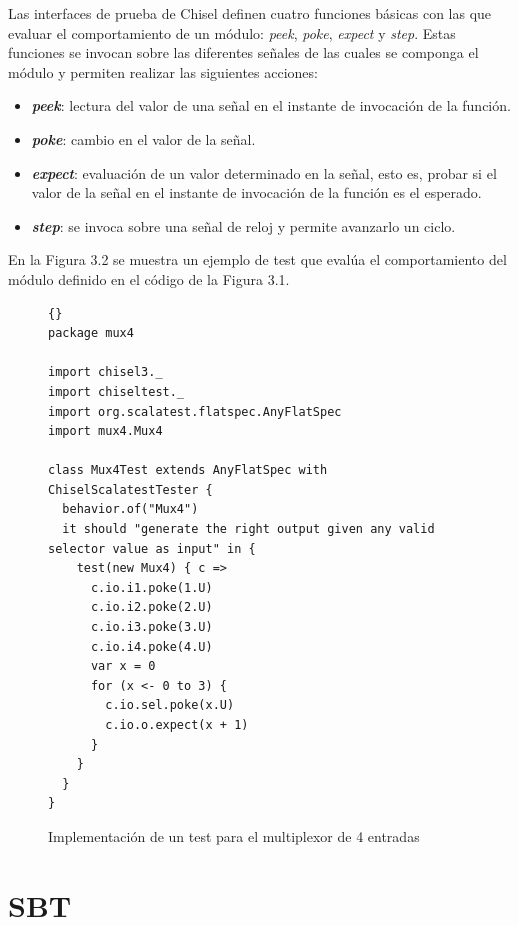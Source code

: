 Las interfaces de prueba de Chisel definen cuatro funciones básicas con las que evaluar el comportamiento de un módulo: \textit{peek}, \textit{poke},  \textit{expect} y \textit{step}. Estas funciones se invocan sobre las diferentes señales de las cuales se componga el módulo y permiten realizar las siguientes acciones:

\begin{itemize}
  \item \textbf{\textit{peek}}: lectura del valor de una señal en el instante de invocación de la función.
  \vspace{-0.2cm}
  \item \textbf{\textit{poke}}: cambio en el valor de la señal.
  \vspace{-0.2cm}
  \item \textbf{\textit{expect}}: evaluación de un valor determinado en la señal, esto es, probar si el valor de la señal en el instante de invocación de la función es el esperado.
  \vspace{-0.2cm}
  \item \textbf{\textit{step}}: se invoca sobre una señal de reloj y permite avanzarlo un ciclo.
\end{itemize}

En la Figura 3.2 se muestra un ejemplo de test que evalúa el comportamiento del módulo definido en el código de la Figura 3.1.

\begin{figure}
\begin{lstlisting}[style=scalaStyle]{}
package mux4

import chisel3._
import chiseltest._
import org.scalatest.flatspec.AnyFlatSpec
import mux4.Mux4

class Mux4Test extends AnyFlatSpec with ChiselScalatestTester {
  behavior.of("Mux4")
  it should "generate the right output given any valid selector value as input" in {
    test(new Mux4) { c =>
      c.io.i1.poke(1.U)
      c.io.i2.poke(2.U)
      c.io.i3.poke(3.U)
      c.io.i4.poke(4.U)
      var x = 0
      for (x <- 0 to 3) {
        c.io.sel.poke(x.U)
        c.io.o.expect(x + 1)
      }
    }
  }
}
\end{lstlisting}
\caption{Implementación de un test para el multiplexor de 4 entradas}
\end{figure}


\section{SBT}

